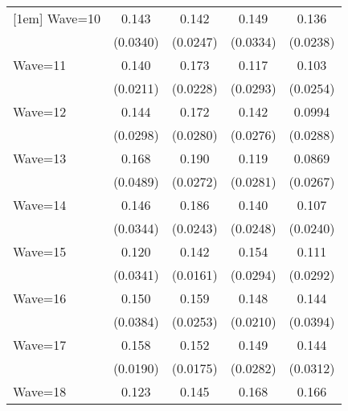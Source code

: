 {\begin{tabular}{l*{4}{c}}
[1em]
Wave=10             &       0.143\sym{***}&       0.142\sym{***}&       0.149\sym{***}&       0.136\sym{***}\\
                    &    (0.0340)         &    (0.0247)         &    (0.0334)         &    (0.0238)         \\
[1em]
Wave=11             &       0.140\sym{***}&       0.173\sym{***}&       0.117\sym{***}&       0.103\sym{***}\\
                    &    (0.0211)         &    (0.0228)         &    (0.0293)         &    (0.0254)         \\
[1em]
Wave=12             &       0.144\sym{***}&       0.172\sym{***}&       0.142\sym{***}&      0.0994\sym{***}\\
                    &    (0.0298)         &    (0.0280)         &    (0.0276)         &    (0.0288)         \\
[1em]
Wave=13             &       0.168\sym{***}&       0.190\sym{***}&       0.119\sym{***}&      0.0869\sym{**} \\
                    &    (0.0489)         &    (0.0272)         &    (0.0281)         &    (0.0267)         \\
[1em]
Wave=14             &       0.146\sym{***}&       0.186\sym{***}&       0.140\sym{***}&       0.107\sym{***}\\
                    &    (0.0344)         &    (0.0243)         &    (0.0248)         &    (0.0240)         \\
[1em]
Wave=15             &       0.120\sym{***}&       0.142\sym{***}&       0.154\sym{***}&       0.111\sym{***}\\
                    &    (0.0341)         &    (0.0161)         &    (0.0294)         &    (0.0292)         \\
[1em]
Wave=16             &       0.150\sym{***}&       0.159\sym{***}&       0.148\sym{***}&       0.144\sym{***}\\
                    &    (0.0384)         &    (0.0253)         &    (0.0210)         &    (0.0394)         \\
[1em]
Wave=17             &       0.158\sym{***}&       0.152\sym{***}&       0.149\sym{***}&       0.144\sym{***}\\
                    &    (0.0190)         &    (0.0175)         &    (0.0282)         &    (0.0312)         \\
[1em]
Wave=18             &       0.123\sym{***}&       0.145\sym{***}&       0.168\sym{***}&       0.166\sym{***}\\

\end{tabular}}
